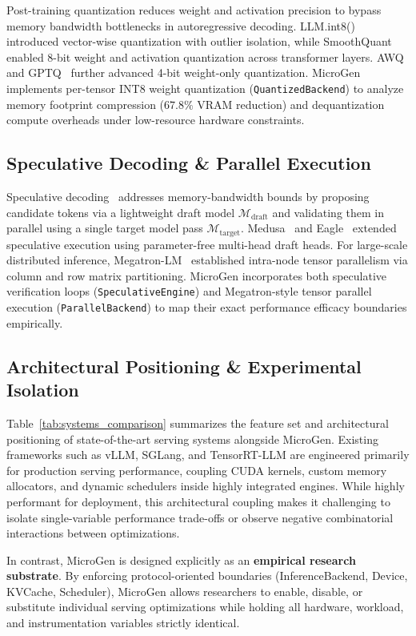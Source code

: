 Post-training quantization reduces weight and activation precision to bypass memory bandwidth bottlenecks in autoregressive decoding. LLM.int8()~\cite{dettmers2022llmint8} introduced vector-wise quantization with outlier isolation, while SmoothQuant~\cite{xiao2023smoothquant} enabled 8-bit weight and activation quantization across transformer layers. AWQ~\cite{lin2023awq} and GPTQ~\cite{frantar2022gptq} further advanced 4-bit weight-only quantization. \textsf{MicroGen} implements per-tensor INT8 weight quantization (\texttt{QuantizedBackend}) to analyze memory footprint compression ($67.8\%$ VRAM reduction) and dequantization compute overheads under low-resource hardware constraints.

\subsection{Speculative Decoding \& Parallel Execution}
\label{sec:rel_speculative}

Speculative decoding~\cite{chen2023speculative,leviathan2023fast} addresses memory-bandwidth bounds by proposing candidate tokens via a lightweight draft model $\mathcal{M}_{\text{draft}}$ and validating them in parallel using a single target model pass $\mathcal{M}_{\text{target}}$. Medusa~\cite{cai2024medusa} and Eagle~\cite{li2024eagle} extended speculative execution using parameter-free multi-head draft heads. For large-scale distributed inference, Megatron-LM~\cite{shoeybi2019megatron} established intra-node tensor parallelism via column and row matrix partitioning. \textsf{MicroGen} incorporates both speculative verification loops (\texttt{SpeculativeEngine}) and Megatron-style tensor parallel execution (\texttt{ParallelBackend}) to map their exact performance efficacy boundaries empirically.



\subsection{Architectural Positioning \& Experimental Isolation}
\label{sec:rel_positioning}

Table~\ref{tab:systems_comparison} summarizes the feature set and architectural positioning of state-of-the-art serving systems alongside \textsf{MicroGen}. Existing frameworks such as vLLM, SGLang, and TensorRT-LLM are engineered primarily for production serving performance, coupling CUDA kernels, custom memory allocators, and dynamic schedulers inside highly integrated engines. While highly performant for deployment, this architectural coupling makes it challenging to isolate single-variable performance trade-offs or observe negative combinatorial interactions between optimizations.

In contrast, \textsf{MicroGen} is designed explicitly as an \textbf{empirical research substrate}. By enforcing protocol-oriented boundaries (\textsf{InferenceBackend}, \textsf{Device}, \textsf{KVCache}, \textsf{Scheduler}), \textsf{MicroGen} allows researchers to enable, disable, or substitute individual serving optimizations while holding all hardware, workload, and instrumentation variables strictly identical.
